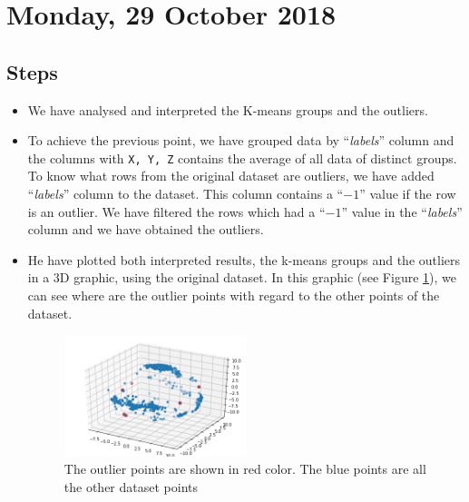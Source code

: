 \section{Monday, 29 October 2018}

\subsection{Steps}
\begin{itemize}
\item We have analysed and interpreted the K-means groups and the outliers.
\item To achieve the previous point, we have grouped data by  ``\textit{labels}'' column and the columns with \texttt{X, Y, Z} contains the average of all data of distinct groups.  \\
To know what rows from the original dataset are outliers, we have added ``\textit{labels}'' column to the dataset. This column contains a ``$-1$'' value if the row is an outlier. We have filtered the rows which had a ``$-1$'' value in the ``\textit{labels}'' column and we have obtained the outliers.
\item He have plotted both interpreted results, the k-means groups and the outliers in a 3D graphic, using the original dataset. In this graphic (see Figure \ref{fig:outliers}), we can see where are the outlier points with regard to the other points of the dataset. 

\begin{figure}[!htb]
\centering
\includegraphics[width=0.5\textwidth]{../../reports/figures/outliers3D_AccelerometerStat.png}
\caption{The outlier points are shown in red color. The blue points are all the other dataset points}
\label{fig:outliers}
\end{figure}

\end{itemize}
